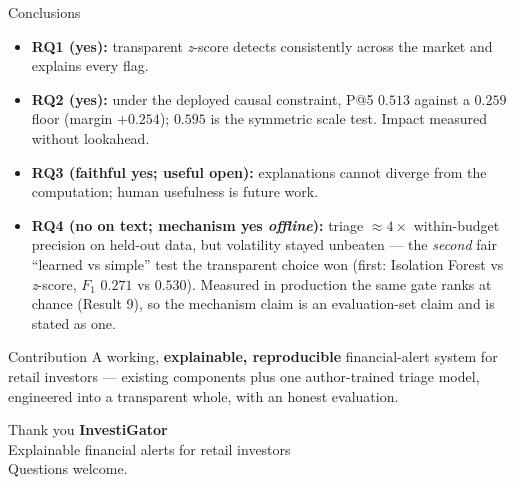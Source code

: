 \documentclass[aspectratio=169]{beamer}
\begin{document}
\begin{frame}{Conclusions}
\begin{itemize}
  \item \textbf{RQ1 (yes):} transparent \emph{z}-score detects consistently across the market and explains every flag.
  \item \textbf{RQ2 (yes):} under the deployed causal constraint, P@5 $0.513$ against a $0.259$ floor (margin $+0.254$); $0.595$ is the symmetric scale test. Impact measured without lookahead.
  \item \textbf{RQ3 (faithful yes; useful open):} explanations cannot diverge from the computation; human usefulness is future work.
  \item \textbf{RQ4 (no on text; mechanism yes \emph{offline}):} triage $\approx 4\times$ within-budget precision on held-out data, but volatility stayed unbeaten --- the \emph{second} fair ``learned vs simple'' test the transparent choice won (first: Isolation Forest vs \emph{z}-score, $F_1$ $0.271$ vs $0.530$). Measured in production the same gate ranks at chance (Result 9), so the mechanism claim is an evaluation-set claim and is stated as one.
\end{itemize}
\vfill
\begin{block}{Contribution}
A working, \textbf{explainable, reproducible} financial-alert system for retail investors --- existing components plus one author-trained triage model, engineered into a transparent whole, with an honest evaluation.
\end{block}
\end{frame}

\begin{frame}{Thank you}
\vfill
\centering
{\Huge \textbf{InvestiGator}} \\[4mm]
{\large Explainable financial alerts for retail investors} \\[8mm]
{\footnotesize Questions welcome.}
\vfill
\end{frame}
\end{document}
